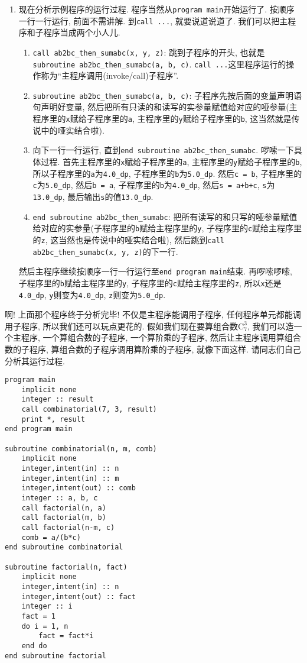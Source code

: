 \begin{enumerate}
    \item 现在分析示例程序的运行过程. 程序当然从\verb|program main|开始运行了. 按顺序一行一行运行, 前面不需讲解. 到\verb|call ...|, 就要说道说道了. 我们可以把主程序和子程序当成两个小人儿.\begin{enumerate}
        \item \verb|call ab2bc_then_sumabc(x, y, z)|: 跳到子程序的开头, 也就是\verb|subroutine ab2bc_then_sumabc(a, b, c)|. \verb|call ...|这里程序运行的操作称为``主程序调用(invoke/call)子程序''.
        \item \verb|subroutine ab2bc_then_sumabc(a, b, c)|: 子程序先按后面的变量声明语句声明好变量, 然后把所有只读的和读写的实参量赋值给对应的哑参量(主程序里的\verb|x|赋给子程序里的\verb|a|, 主程序里的\verb|y|赋给子程序里的\verb|b|, 这当然就是传说中的哑实结合啦).
        \item 向下一行一行运行, 直到\verb|end subroutine ab2bc_then_sumabc|. 啰嗦一下具体过程. 首先主程序里的\verb|x|赋给子程序里的\verb|a|, 主程序里的\verb|y|赋给子程序里的\verb|b|, 所以子程序里的\verb|a|为\verb|4.0_dp|, 子程序里的\verb|b|为\verb|5.0_dp|. 然后\verb|c = b|, 子程序里的\verb|c|为\verb|5.0_dp|, 然后\verb|b = a|, 子程序里的\verb|b|为\verb|4.0_dp|, 然后\verb|s = a+b+c|, \verb|s|为\verb|13.0_dp|, 最后输出\verb|s|的值\verb|13.0_dp|.
        \item \verb|end subroutine ab2bc_then_sumabc|: 把所有读写的和只写的哑参量赋值给对应的实参量(子程序里的\verb|b|赋给主程序里的\verb|y|, 子程序里的\verb|c|赋给主程序里的\verb|z|, 这当然也是传说中的哑实结合啦), 然后跳到\verb|call ab2bc_then_sumabc(x, y, z)|的下一行.
    \end{enumerate}然后主程序继续按顺序一行一行运行至\verb|end program main|结束. 再啰嗦啰嗦, 子程序里的\verb|b|赋给主程序里的\verb|y|, 子程序里的\verb|c|赋给主程序里的\verb|z|, 所以\verb|x|还是\verb|4.0_dp|, \verb|y|则变为\verb|4.0_dp|, \verb|z|则变为\verb|5.0_dp|.
\end{enumerate}

啊! 上面那个程序终于分析完毕! 不仅是主程序能调用子程序, 任何程序单元都能调用子程序, 所以我们还可以玩点更花的. 假如我们现在要算组合数$\text{C}_7^3$, 我们可以造一个主程序, 一个算组合数的子程序, 一个算阶乘的子程序, 然后让主程序调用算组合数的子程序, 算组合数的子程序调用算阶乘的子程序, 就像下面这样. 请同志们自己分析其运行过程.\label{fact_comb}
\begin{verbatim}
program main
    implicit none
    integer :: result
    call combinatorial(7, 3, result)
    print *, result
end program main

subroutine combinatorial(n, m, comb)
    implicit none
    integer,intent(in) :: n
    integer,intent(in) :: m
    integer,intent(out) :: comb
    integer :: a, b, c
    call factorial(n, a)
    call factorial(m, b)
    call factorial(n-m, c)
    comb = a/(b*c)
end subroutine combinatorial

subroutine factorial(n, fact)
    implicit none
    integer,intent(in) :: n
    integer,intent(out) :: fact
    integer :: i
    fact = 1
    do i = 1, n
        fact = fact*i
    end do
end subroutine factorial
\end{verbatim}

